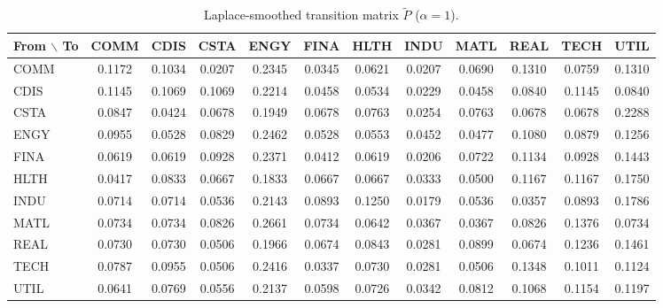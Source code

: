 \documentclass[11pt]{article}
\begin{document}
\begin{table}[htbp]\centering
\caption{Laplace-smoothed transition matrix $\tilde P$ ($\alpha = 1$).}
\label{tab:ptilde}
\scriptsize
\setlength{\tabcolsep}{3pt}
\begin{tabular}{lccccccccccc}
\toprule
From $\backslash$ To & COMM & CDIS & CSTA & ENGY & FINA & HLTH & INDU & MATL & REAL & TECH & UTIL \\
\midrule
COMM & 0.1172 & 0.1034 & 0.0207 & 0.2345 & 0.0345 & 0.0621 & 0.0207 & 0.0690 & 0.1310 & 0.0759 & 0.1310 \\
CDIS & 0.1145 & 0.1069 & 0.1069 & 0.2214 & 0.0458 & 0.0534 & 0.0229 & 0.0458 & 0.0840 & 0.1145 & 0.0840 \\
CSTA & 0.0847 & 0.0424 & 0.0678 & 0.1949 & 0.0678 & 0.0763 & 0.0254 & 0.0763 & 0.0678 & 0.0678 & 0.2288 \\
ENGY & 0.0955 & 0.0528 & 0.0829 & 0.2462 & 0.0528 & 0.0553 & 0.0452 & 0.0477 & 0.1080 & 0.0879 & 0.1256 \\
FINA & 0.0619 & 0.0619 & 0.0928 & 0.2371 & 0.0412 & 0.0619 & 0.0206 & 0.0722 & 0.1134 & 0.0928 & 0.1443 \\
HLTH & 0.0417 & 0.0833 & 0.0667 & 0.1833 & 0.0667 & 0.0667 & 0.0333 & 0.0500 & 0.1167 & 0.1167 & 0.1750 \\
INDU & 0.0714 & 0.0714 & 0.0536 & 0.2143 & 0.0893 & 0.1250 & 0.0179 & 0.0536 & 0.0357 & 0.0893 & 0.1786 \\
MATL & 0.0734 & 0.0734 & 0.0826 & 0.2661 & 0.0734 & 0.0642 & 0.0367 & 0.0367 & 0.0826 & 0.1376 & 0.0734 \\
REAL & 0.0730 & 0.0730 & 0.0506 & 0.1966 & 0.0674 & 0.0843 & 0.0281 & 0.0899 & 0.0674 & 0.1236 & 0.1461 \\
TECH & 0.0787 & 0.0955 & 0.0506 & 0.2416 & 0.0337 & 0.0730 & 0.0281 & 0.0506 & 0.1348 & 0.1011 & 0.1124 \\
UTIL & 0.0641 & 0.0769 & 0.0556 & 0.2137 & 0.0598 & 0.0726 & 0.0342 & 0.0812 & 0.1068 & 0.1154 & 0.1197 \\
\bottomrule
\end{tabular}
\end{table}
\end{document}
